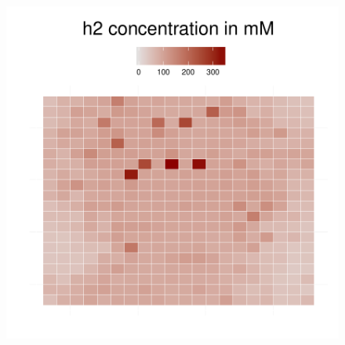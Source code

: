 \begin{figure}[h!]
{\begin{minipage}[t]{0.3\textwidth}
  \end{minipage}
  \begin{minipage}[t]{0.3\textwidth}
    \includegraphics[width=\textwidth]{../results/ecoli_beijerinckii_20x20_seed5147_h260.pdf}
  \end{minipage}
  }
\end{figure}
